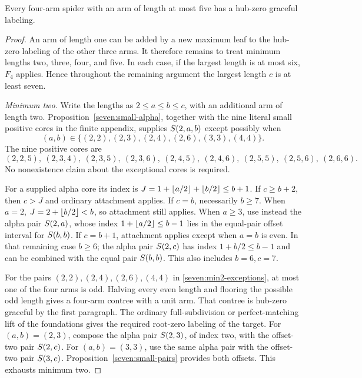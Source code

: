\begin{lemma}\label{seven:four-short}
Every four-arm spider with an arm of length at most five has a
hub-zero graceful labeling.
\end{lemma}
\begin{proof}
An arm of length one can be added by a new maximum leaf to the
hub-zero labeling of the other three arms.  It therefore remains to
treat minimum lengths two, three, four, and five.  In each case, if
the largest length is at most six, $F_4$ applies.  Hence throughout
the remaining argument the largest length $c$ is at least seven.

\medskip\noindent
\emph{Minimum two.}
Write the lengths as $2\le a\le b\le c$, with an additional arm of
length two.  Proposition~\ref{seven:small-alpha}, together with the
nine literal small positive cores in the finite appendix, supplies
$S\!\left(2,a,b\right)$ except possibly when
\begin{equation}\label{seven:min2-exceptions}
 (a,b)\in\{(2,2),(2,3),(2,4),(2,6),(3,3),(4,4)\}.
\end{equation}
The nine positive cores are
\[
 (2,2,5),\ (2,3,4),\ (2,3,5),\ (2,3,6),\ (2,4,5),\
 (2,4,6),\ (2,5,5),\ (2,5,6),\ (2,6,6).
\]
No nonexistence claim about the exceptional cores is required.

For a supplied alpha core its index is
$J=1+\left\lfloor a/2\right\rfloor+\left\lfloor b/2\right\rfloor\le b+1$.  If $c\ge b+2$, then
$c>J$ and ordinary attachment applies.  If $c=b$, necessarily $b\ge7$.
When $a=2$, $J=2+\left\lfloor b/2\right\rfloor<b$, so attachment still applies.
When $a\ge3$, use instead the alpha pair $S\!\left(2,a\right)$, whose index
$1+\left\lfloor a/2\right\rfloor\le b-1$ lies in the equal-pair offset interval for
$S\!\left(b,b\right)$.  If $c=b+1$, attachment applies except when $a=b$ is
even.  In that remaining case $b\ge6$; the alpha pair $S\!\left(2,c\right)$
has index $1+b/2\le b-1$ and can be combined with the equal pair
$S\!\left(b,b\right)$.  This also includes $b=6,c=7$.

For the pairs $(2,2),(2,4),(2,6),(4,4)$ in
\eqref{seven:min2-exceptions}, at most one of the four arms is odd.
Halving every even length and flooring the possible odd length gives
a four-arm contree with a unit arm.  That contree is hub-zero graceful
by the first paragraph.  The ordinary full-subdivision or
perfect-matching lift of the foundations gives the required
root-zero labeling of the target.  For $(a,b)=(2,3)$, compose the
alpha pair $S\!\left(2,3\right)$, of index two, with the offset-two pair
$S\!\left(2,c\right)$.  For $(a,b)=(3,3)$, use the same alpha pair with the
offset-two pair $S\!\left(3,c\right)$.  Proposition~\ref{seven:small-pairs}
provides both offsets.  This exhausts minimum two.


\end{proof}
